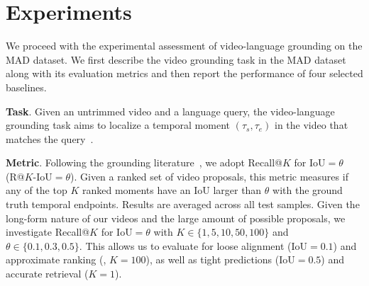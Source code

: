 \documentclass[10pt,twocolumn,letterpaper]{article}
\renewcommand{\paragraph}[1]{\vspace{1mm}\noindent\textbf{#1}.}
\begin{document}
 \section{Experiments}\label{sec: experiments}
We proceed with the experimental assessment of video-language grounding on the MAD dataset. We first describe the video grounding task in the MAD dataset along with its evaluation metrics and then report the performance of four selected baselines.

\paragraph{Task}
Given an untrimmed video and a language query, the video-language grounding task aims to localize a temporal moment $(\tau_s, \tau_e)$ in the video that matches the query~\cite{Gao_2017_ICCV,Hendricks_2017_ICCV}. 

\paragraph{Metric}
Following the grounding literature~\cite{Gao_2017_ICCV,Hendricks_2017_ICCV}, we adopt Recall@$K$ for IoU${=}\theta$ (R@$K$-IoU${=}\theta$). Given a ranked set of video proposals, this metric measures if any of the top $K$ ranked moments have an IoU larger than $\theta$ with the ground truth temporal endpoints. Results are averaged across all test samples. Given the long-form nature of our videos and the large amount of possible proposals, we investigate Recall@$K$ for IoU${=}\theta$ with $K{\in}\{1,5,10,50,100\}$ and $\theta{\in}\{0.1, 0.3, 0.5\}$. 
This allows us to evaluate for loose alignment (\ie IoU${=}0.1$) and approximate ranking (\ie, $K{=}100$), as well as tight predictions (\ie IoU${=}0.5$) and accurate retrieval (\ie $K{=}1$). 
\end{document}
